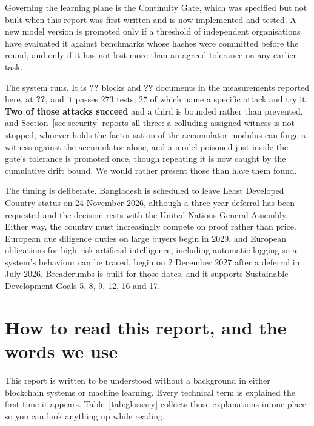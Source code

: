 \documentclass[11pt,a4paper]{article}
\providecommand{\num}[1]{\textbf{??}}%
\providecommand{\numunit}[2]{\textbf{??}}%
\begin{document}
Governing the learning plane is the Continuity Gate, which was specified but not
built when this report was first written and is now implemented and tested. A new
model version is promoted only if a threshold of independent organisations have
evaluated it against benchmarks whose hashes were committed before the round, and
only if it has not lost more than an agreed tolerance on any earlier task.

The system runs. It is \num{LedgerBlocksWritten} blocks and
\num{LedgerDocuments} documents in the measurements reported here, at
\numunit{LedgerDocumentsPerSecond}{committed documents per second}, and it passes
273 tests, 27 of which name a specific attack and try it. \textbf{Two of those
attacks succeed} and a third is bounded rather than prevented, and
Section~\ref{sec:security} reports all three: a colluding assigned witness is not
stopped, whoever holds the factorisation of the accumulator modulus can forge a
witness against the accumulator alone, and a model poisoned just inside the
gate's tolerance is promoted once, though repeating it is now caught by the
cumulative drift bound. We would rather present those than have them found.

The timing is deliberate. Bangladesh is scheduled to leave Least Developed
Country status on 24 November 2026, although a three-year deferral has been
requested and the decision rests with the United Nations General Assembly. Either
way, the country must increasingly compete on proof rather than price. European
due diligence duties on large buyers begin in 2029, and European obligations for
high-risk artificial intelligence, including automatic logging so a system's
behaviour can be traced, begin on 2 December 2027 after a deferral in July 2026.
Breadcrumbs is built for those dates, and it supports Sustainable Development
Goals 5, 8, 9, 12, 16 and 17.

\tableofcontents
\newpage

\section{How to read this report, and the words we use}

This report is written to be understood without a background in either
blockchain systems or machine learning. Every technical term is explained the
first time it appears. Table~\ref{tab:glossary} collects those explanations in
one place so you can look anything up while reading.
\end{document}
